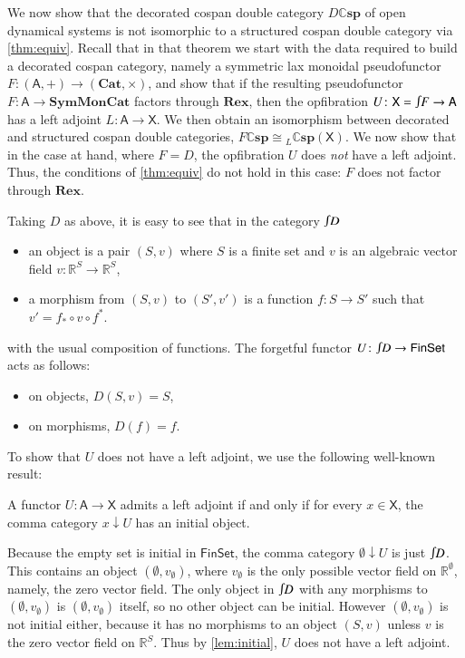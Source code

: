 \documentclass[reqno]{amsart}
\newcommand{\R}{\mathbb{R}}
\let\maps\colon
\theoremstyle{definition}
\theoremstyle{remark}
\newcommand{\Set}{\mathsf{Set}}
\newcommand{\A}{\mathsf{A}}
\newcommand{\X}{\mathsf{X}}
\newcommand{\Fin}{\mathsf{Fin}}
\newcommand{\bicat}{\mathbf}
\newcommand{\Cat}{\bicat{Cat}}
\newcommand{\Rex}{\bicat{Rex}}
\newcommand{\SMC}{\bicat{SymMonCat}}
\newcommand{\double}[1]{\mathbf{\mathbb #1}}
\newcommand{\lCsp}{\double{Csp}}
\newcommand{\inta}{\raisebox{.3\depth}{$\smallint\hspace{-.01in}$}}
\begin{document}
We now show that the decorated cospan double category $D \lCsp$ of open dynamical systems is not isomorphic to a structured cospan double category via \cref{thm:equiv}. Recall that in that theorem we start with the data required to build a decorated cospan category, namely a symmetric lax monoidal pseudofunctor $F \maps (\A,+) \to (\Cat,\times)$, and show that if the resulting pseudofunctor $F \maps \A \to \SMC$ factors through $\Rex$, then the opfibration $U \maps \X = \inta F \to \A$ has a left adjoint $L \maps \A \to \X$. We then obtain an isomorphism between decorated and structured cospan double categories, $F \lCsp \cong {}_L \lCsp(\X)$. We now show that in the case at hand, where $F = D$, the opfibration $U$ does \emph{not} have a left adjoint. Thus, the conditions of \cref{thm:equiv} do not hold in this case: $F$ does not factor through $\Rex$.

Taking $D$ as above, it is easy to see that in the category $\inta D$
\begin{itemize}
\item an object is a pair $(S,v)$ where $S$ is a finite set and $v$ is an algebraic vector field $v \maps \R^S \to \R^S$,
\item a morphism from $(S,v)$ to $(S',v')$ is a function $f \maps S \to S'$ such that $v' = f_* \circ v \circ f^*$.
\end{itemize}
with the usual composition of functions.   The forgetful functor $U \maps \inta D \to \Fin\Set$ acts as follows:
\begin{itemize}
\item on objects, $D(S,v) = S$,
\item on morphisms, $D(f) = f$.
\end{itemize}

To show that $U$ does not have a left adjoint, we use the following well-known result:
\begin{lem} \label{lem:initial}
A functor $U \maps \A \to \X$ admits a left adjoint if and only if for every $x \in \X$, the comma category $x \downarrow U$ has an initial object.
\end{lem}
Because the empty set is initial in $\Fin\Set$, the comma category 
$\emptyset \downarrow U$ is just $\inta D$.  This contains an object $(\emptyset, v_\emptyset)$, where $v_\emptyset$ is the only possible vector field on $\R^\emptyset$, namely, the zero vector field.   The only object in $\inta D$ with any morphisms to $(\emptyset, v_\emptyset)$ is $(\emptyset, v_\emptyset)$ itself, so no other object can be initial.  However $(\emptyset, v_\emptyset)$ is not initial either, because it has no morphisms to an object $(S,v)$ unless $v$ is the zero vector field on $\R^S$.  Thus by \cref{lem:initial}, $U$ does not have a left adjoint.
\end{document}
